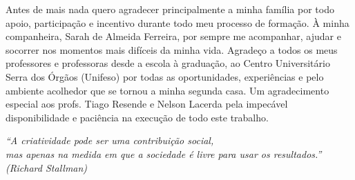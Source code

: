 \documentclass[
	12pt,				%
	openright,			%
	oneside,			%
	a4paper,			%
	chapter=TITLE,		%
	section=TITLE,		%
	subsection=TITLE,	%
	subsubsection=TITLE,%
	english,			%
	brazil				%
	]{abntex2}
\theoremstyle{definition}
\begin{document}
\begin{agradecimentos}

Antes de mais nada quero agradecer principalmente a minha família por todo apoio, participação e incentivo durante todo meu processo de formação. À minha companheira, Sarah de Almeida Ferreira, por sempre me acompanhar, ajudar e socorrer nos momentos mais difíceis da minha vida. Agradeço a todos os meus professores e professoras desde a escola à graduação, ao Centro Universitário Serra dos Órgãos (Unifeso) por todas as oportunidades, experiências e pelo ambiente acolhedor que se tornou a minha segunda casa. Um agradecimento especial aos profs. Tiago Resende e Nelson Lacerda pela impecável disponibilidade e paciência na execução de todo este trabalho.


\end{agradecimentos}



\begin{epigrafe}
    \vspace*{\fill}
	\begin{flushright}
		\textit{``A criatividade pode ser uma contribuição social, \\ mas apenas na medida em que a sociedade é livre para usar os resultados.''\\
		(Richard Stallman)}
	\end{flushright}
\end{epigrafe}

\end{document}
